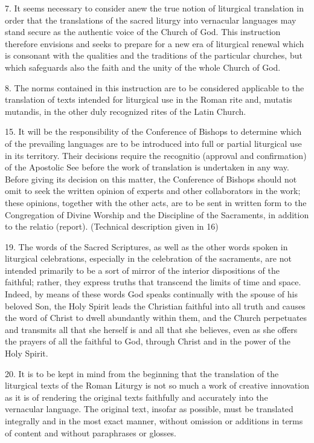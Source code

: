 \documentclass[oneside]{book}
\begin{document}
7. It seems necessary to consider anew the true notion of liturgical translation
in order that the translations of the sacred liturgy into vernacular languages
may stand secure as the authentic voice of the Church of God. This instruction
therefore envisions and seeks to prepare for a new era of liturgical renewal
which is consonant with the qualities and the traditions of the particular
churches, but which safeguards also the faith and the unity of the whole Church
of God.

8. The norms contained in this instruction are to be considered applicable to
the translation of texts intended for liturgical use in the Roman rite and,
mutatis mutandis, in the other duly recognized rites of the Latin Church.

15. It will be the responsibility of the Conference of Bishops to determine
which of the prevailing languages are to be introduced into full or partial
liturgical use in its territory. Their decisions require the recognitio
(approval and confirmation) of the Apostolic See before the work of translation
is undertaken in any way. Before giving its decision on this matter, the
Conference of Bishops should not omit to seek the written opinion of experts and
other collaborators in the work; these opinions, together with the other acts,
are to be sent in written form to the Congregation of Divine Worship and the
Discipline of the Sacraments, in addition to the relatio (report). (Technical
description given in 16)

19. The words of the Sacred Scriptures, as well as the other words spoken in
liturgical celebrations, especially in the celebration of the sacraments, are
not intended primarily to be a sort of mirror of the interior dispositions of
the faithful; rather, they express truths that transcend the limits of time and
space. Indeed, by means of these words God speaks continually with the spouse of
his beloved Son, the Holy Spirit leads the Christian faithful into all truth and
causes the word of Christ to dwell abundantly within them, and the Church
perpetuates and transmits all that she herself is and all that she believes,
even as she offers the prayers of all the faithful to God, through Christ and in
the power of the Holy Spirit.

20. It is to be kept in mind from the beginning that the translation of the
liturgical texts of the Roman Liturgy is not so much a work of creative
innovation as it is of rendering the original texts faithfully and accurately
into the vernacular language. The original text, insofar as possible, must be
translated integrally and in the most exact manner, without omission or
additions in terms of content and without paraphrases or glosses.
\end{document}
